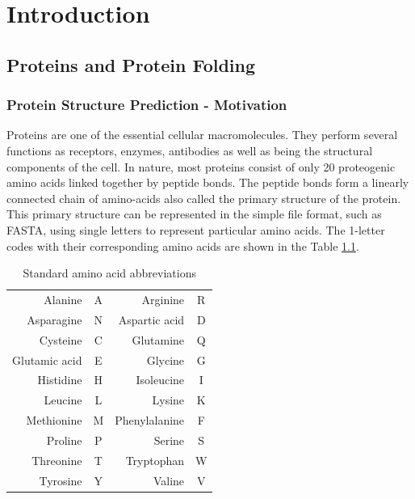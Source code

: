 \chapter{Introduction}

\section{Proteins and Protein Folding}

\subsection{Protein Structure Prediction - Motivation}
    
    
Proteins are one of the essential cellular macromolecules. 
They perform several functions as receptors, enzymes, antibodies as well as being the structural components of the cell.
In nature, most proteins consist of only 20 proteogenic amino acids linked together by peptide bonds.
The peptide bonds form a linearly connected chain of amino-acids also called the primary structure of the protein.
This primary structure can be represented in the simple file format, such as FASTA, using single letters to represent particular amino acids.
The 1-letter codes with their corresponding amino acids are shown in the Table \ref{tab:aa_codes}.

\begin{table}
    \centering
    \begin{tabular}{r|c|r|c|}
        Alanine & A & Arginine & R \\
        Asparagine & N & Aspartic acid & D \\
        Cysteine & C & Glutamine & Q \\
        Glutamic acid & E & Glycine & G \\
        Histidine & H & Isoleucine & I \\
        Leucine & L & Lysine & K \\
        Methionine & M & Phenylalanine & F \\
        Proline & P & Serine & S \\
        Threonine & T & Tryptophan & W \\
        Tyrosine & Y & Valine & V
    \end{tabular}
    \caption{Standard amino acid abbreviations}
    \label{tab:aa_codes}
\end{table}

